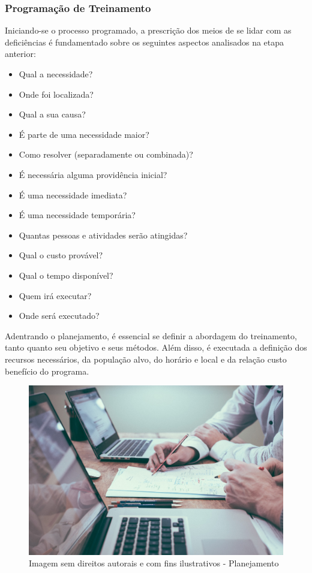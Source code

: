 \documentclass[12pt]{article}
\begin{document}
\subsubsection{Programação de Treinamento}
Iniciando-se o processo programado, a prescrição dos meios de se lidar com as deficiências é fundamentado sobre os seguintes aspectos analisados na etapa anterior: 
\begin{itemize}
\item Qual a necessidade?
\item Onde foi localizada?
\item Qual a sua causa?
\item É parte de uma necessidade maior?
\item Como resolver (separadamente ou combinada)?
\item É necessária alguma providência inicial?
\item É uma necessidade imediata?
\item É uma necessidade temporária?
\item Quantas pessoas e atividades serão atingidas?
\item Qual o custo provável?
\item Qual o tempo disponível?
\item Quem irá executar?
\item Onde será executado?
\end{itemize}

Adentrando o planejamento, é essencial se definir a abordagem do treinamento, tanto quanto seu objetivo e seus métodos. Além disso, é executada a definição dos recursos necessários, da população alvo, do horário e local e da relação custo benefício do programa.

\newpage

\begin{figure}[h]
	\centering
	\includegraphics[width=1.0\textwidth]{build/images/planejamento}
	\caption{Imagem sem direitos autorais e com fins ilustrativos - Planejamento}
	\label{fig:mesh1}
\end{figure}
\end{document}
